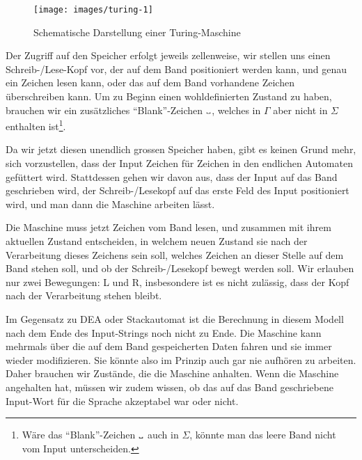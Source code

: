 \begin{figure}
\begin{center}
\texttt{[image: images/turing-1]}
\end{center}
\caption{Schematische Darstellung einer Turing-Maschine\label{turingfig}}
\end{figure}

Der Zugriff auf den Speicher erfolgt jeweils zellenweise, wir stellen
uns einen Schreib-/Lese-Kopf vor, der auf dem Band positioniert werden
kann, und genau ein Zeichen lesen kann, oder das auf dem Band vorhandene
Zeichen überschreiben kann. Um zu Beginn einen wohldefinierten Zustand
zu haben, brauchen wir ein zusätzliches ``Blank''-Zeichen $\blank$,
welches in $\Gamma$ aber nicht in $\Sigma$ enthalten ist\footnote{Wäre
das ``Blank''-Zeichen $\blank$ auch in $\Sigma$, könnte man das
leere Band nicht vom Input unterscheiden.}.

Da wir jetzt diesen unendlich grossen Speicher haben, gibt es keinen
Grund mehr, sich vorzustellen, dass der Input Zeichen für Zeichen
in den endlichen Automaten gefüttert wird. Stattdessen gehen wir
davon aus, dass der Input auf das Band geschrieben wird, der
Schreib-/Lesekopf auf das erste Feld des Input positioniert wird,
und man dann die Maschine arbeiten lässt.

Die Maschine muss jetzt Zeichen vom Band lesen, und zusammen mit
ihrem aktuellen Zustand entscheiden, in welchem neuen Zustand
sie nach der Verarbeitung dieses Zeichens sein soll, welches Zeichen
an dieser Stelle auf dem Band stehen soll, und ob der Schreib-/Lesekopf
bewegt werden soll. Wir erlauben nur zwei Bewegungen: L und R, insbesondere
ist es nicht zulässig, dass der Kopf nach der Verarbeitung stehen
bleibt.

Im Gegensatz zu DEA oder Stackautomat ist die Berechnung in diesem
Modell nach dem Ende des Input-Strings noch nicht zu Ende. Die Maschine
kann mehrmals über die auf dem Band gespeicherten Daten fahren und
sie immer wieder modifizieren. Sie könnte also im Prinzip auch
gar nie aufhören zu arbeiten. Daher brauchen wir Zustände, die
die Maschine anhalten. Wenn die Maschine angehalten hat, müssen wir
zudem wissen, ob das auf das Band geschriebene Input-Wort für die
Sprache akzeptabel war oder nicht.

